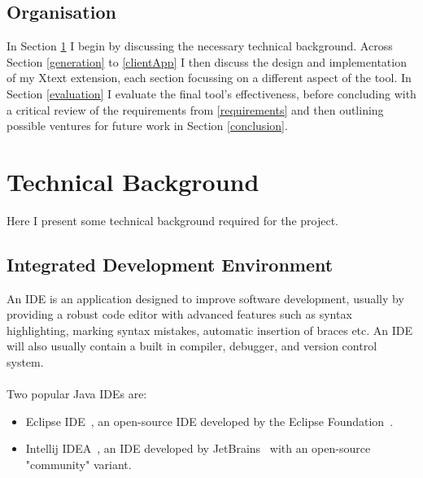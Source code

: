 \documentclass{article}
\begin{document}
\subsection{Organisation} 
In Section \ref{technicalBackground} I begin by discussing the necessary technical background. Across Section \ref{generation} to \ref{clientApp} I then discuss the design and implementation of my Xtext extension, each section focussing on a different aspect of the tool. In Section \ref{evaluation} I evaluate the final tool's effectiveness, before concluding with a critical review of the requirements from \ref{requirements} and then outlining possible ventures for future work in Section \ref{conclusion}. 

\section{Technical Background}\label{technicalBackground}
Here I present some technical background required for the project.
\subsection{Integrated Development Environment}
An IDE is an application designed to improve software development, usually by providing a robust code editor with advanced features such as syntax highlighting, marking syntax mistakes, automatic insertion of braces etc. An IDE will also usually contain a built in compiler, debugger, and version control system. 
\\
\\
Two popular Java IDEs are:
\begin{itemize}
\item Eclipse IDE~\cite{eclipse}, an open-source IDE developed by the Eclipse Foundation~\cite{eclipseFoundation}.
\item Intellij IDEA~\cite{intellij}, an IDE developed by JetBrains~\cite{jetbrains} with an open-source "community" variant.
\end{itemize}
%
\end{document}
